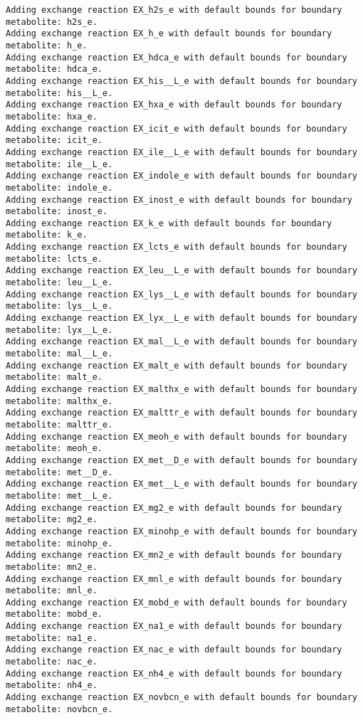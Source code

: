\documentclass[
  letterpaper,
  DIV=11,
  numbers=noendperiod]{scrartcl}
\begin{document}
\begin{verbatim}
Adding exchange reaction EX_h2s_e with default bounds for boundary metabolite: h2s_e.
Adding exchange reaction EX_h_e with default bounds for boundary metabolite: h_e.
Adding exchange reaction EX_hdca_e with default bounds for boundary metabolite: hdca_e.
Adding exchange reaction EX_his__L_e with default bounds for boundary metabolite: his__L_e.
Adding exchange reaction EX_hxa_e with default bounds for boundary metabolite: hxa_e.
Adding exchange reaction EX_icit_e with default bounds for boundary metabolite: icit_e.
Adding exchange reaction EX_ile__L_e with default bounds for boundary metabolite: ile__L_e.
Adding exchange reaction EX_indole_e with default bounds for boundary metabolite: indole_e.
Adding exchange reaction EX_inost_e with default bounds for boundary metabolite: inost_e.
Adding exchange reaction EX_k_e with default bounds for boundary metabolite: k_e.
Adding exchange reaction EX_lcts_e with default bounds for boundary metabolite: lcts_e.
Adding exchange reaction EX_leu__L_e with default bounds for boundary metabolite: leu__L_e.
Adding exchange reaction EX_lys__L_e with default bounds for boundary metabolite: lys__L_e.
Adding exchange reaction EX_lyx__L_e with default bounds for boundary metabolite: lyx__L_e.
Adding exchange reaction EX_mal__L_e with default bounds for boundary metabolite: mal__L_e.
Adding exchange reaction EX_malt_e with default bounds for boundary metabolite: malt_e.
Adding exchange reaction EX_malthx_e with default bounds for boundary metabolite: malthx_e.
Adding exchange reaction EX_malttr_e with default bounds for boundary metabolite: malttr_e.
Adding exchange reaction EX_meoh_e with default bounds for boundary metabolite: meoh_e.
Adding exchange reaction EX_met__D_e with default bounds for boundary metabolite: met__D_e.
Adding exchange reaction EX_met__L_e with default bounds for boundary metabolite: met__L_e.
Adding exchange reaction EX_mg2_e with default bounds for boundary metabolite: mg2_e.
Adding exchange reaction EX_minohp_e with default bounds for boundary metabolite: minohp_e.
Adding exchange reaction EX_mn2_e with default bounds for boundary metabolite: mn2_e.
Adding exchange reaction EX_mnl_e with default bounds for boundary metabolite: mnl_e.
Adding exchange reaction EX_mobd_e with default bounds for boundary metabolite: mobd_e.
Adding exchange reaction EX_na1_e with default bounds for boundary metabolite: na1_e.
Adding exchange reaction EX_nac_e with default bounds for boundary metabolite: nac_e.
Adding exchange reaction EX_nh4_e with default bounds for boundary metabolite: nh4_e.
Adding exchange reaction EX_novbcn_e with default bounds for boundary metabolite: novbcn_e.

\end{verbatim}
\end{document}
